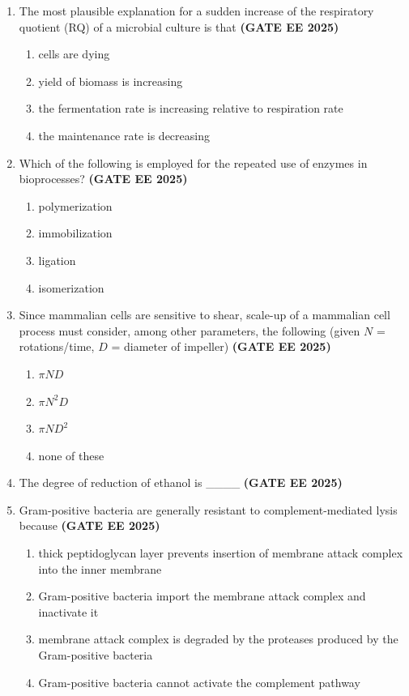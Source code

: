 \documentclass[journal,12pt,onecolumn]{IEEEtran}
\theoremstyle{remark}
\begin{document}
\begin{enumerate}
\item The most plausible explanation for a sudden increase of the respiratory quotient (RQ) of a microbial culture is that \hfill \textbf{(GATE EE 2025)}
\begin{enumerate}
\item  cells are dying
\item  yield of biomass is increasing
\item  the fermentation rate is increasing relative to respiration rate
\item  the maintenance rate is decreasing
\end{enumerate}

\item  Which of the following is employed for the repeated use of enzymes in bioprocesses? \hfill \textbf{(GATE EE 2025)}
\begin{enumerate}
\item  polymerization
\item  immobilization
\item  ligation
\item  isomerization
\end{enumerate}

\item Since mammalian cells are sensitive to shear, scale-up of a mammalian cell process must consider, among other parameters, the following (given $N$ = rotations/time, $D$ = diameter of impeller) \hfill \textbf{(GATE EE 2025)}
\begin{enumerate}
\item  $\pi N D$
\item  $\pi N^2 D$
\item  $\pi N D^2$
\item  none of these
\end{enumerate}

\item  The degree of reduction of ethanol is \_\_\_\_ \hfill \textbf{(GATE EE 2025)}

\item  Gram-positive bacteria are generally resistant to complement-mediated lysis because \hfill \textbf{(GATE EE 2025)}
\begin{enumerate}
\item  thick peptidoglycan layer prevents insertion of membrane attack complex into the inner membrane
\item  Gram-positive bacteria import the membrane attack complex and inactivate it
\item  membrane attack complex is degraded by the proteases produced by the Gram-positive bacteria
\item  Gram-positive bacteria cannot activate the complement pathway
\end{enumerate}


\end{enumerate}
\end{document}
